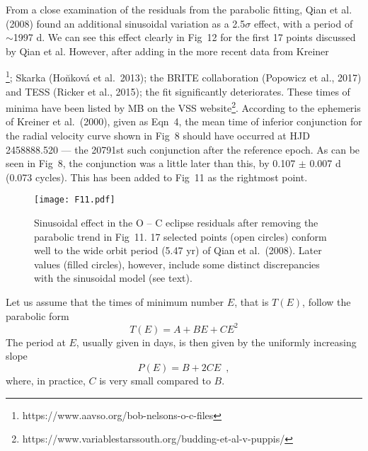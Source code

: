 \documentclass[useAMS,usenatbib]{mnras}                                                                           \usepackage[pdftex]{graphicx}
\begin{document}
  From a close examination of the residuals from the parabolic fitting,
  Qian et al. (2008) found an additional sinusoidal  variation as a 2.5$\sigma$  effect,
  with a period of $\sim$1997 d. We can see this effect clearly
  in Fig~12 for the first 17 points discussed by Qian et al.
However, after adding in the more recent data from Kreiner{\footnote{ 
https://www.aavso.org/bob-nelsons-o-c-files}; Skarka (Ho\u{n}kov\'{a} et al.\ 2013); 
the BRITE collaboration (Popowicz et al., 2017) and TESS (Ricker et al., 2015); the fit significantly deteriorates.  
These times of minima have been listed  by MB on the VSS 
website\footnote{https://www.variablestarssouth.org/budding-et-al-v-puppis/}.
According to the ephemeris of Kreiner et al.\ (2000), given as 
Eqn~4, the mean time of inferior conjunction for the radial velocity curve
shown in Fig~8 should have occurred at HJD 2458888.520 --- the 20791st such
conjunction after the reference epoch.  As can be seen in Fig~8, the conjunction 
was a little later than this, by 0.107 $\pm$ 0.007 d (0.073 cycles).  This has been 
added to Fig~11 as the rightmost point. 
  
 \begin{figure}
\label{fig-12}
\texttt{[image: F11.pdf]}\\
\caption{Sinusoidal effect in the O -- C eclipse residuals
after removing the parabolic trend in Fig~11.  
17 selected points (open circles) conform well
to  the wide orbit period (5.47 yr) of Qian et al.\ (2008).
Later values (filled circles), however, include some 
distinct discrepancies with the sinusoidal model (see text). 
}
\end{figure} 
 
 
Let us assume that the times of minimum number $E$, that is
 $T(E)$, follow the parabolic form
\begin{equation}
T(E) = A + BE + C E^2
\end{equation}
The period at $E$, usually given in days, is then given by the uniformly increasing slope
\begin{equation}
P(E) = B + 2C E  \,\,\,  ,
\end{equation}
where, in practice, $C$ is very small compared to $B$.
 
}
\end{document}
